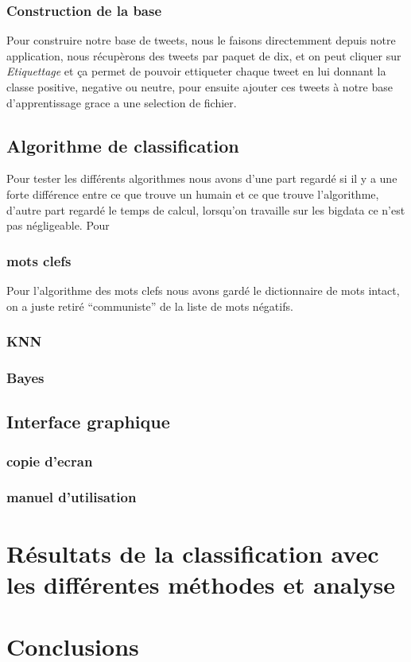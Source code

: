 \documentclass[a4paper,10pt]{report}
\begin{document}
    \subsection{Construction de la base}
      Pour construire notre base de tweets, nous le faisons directemment depuis notre application, nous récupèrons des tweets par 
      paquet de dix, et on peut cliquer sur \emph{Etiquettage} et ça permet de pouvoir ettiqueter chaque tweet en lui donnant la classe positive, negative ou neutre,
      pour ensuite ajouter ces tweets à notre base d'apprentissage grace a une selection de fichier.
  \section{Algorithme de classification}
    Pour tester les différents algorithmes nous avons d'une part regardé si il y a une forte différence entre ce que trouve un humain et ce que trouve l'algorithme, d'autre part
    regardé le temps de calcul, lorsqu'on travaille sur les bigdata ce n'est pas négligeable.
    Pour 
    \subsection{mots clefs}
      Pour l'algorithme des mots clefs nous avons gardé le dictionnaire de mots intact, on a juste retiré ``communiste'' de la liste de mots négatifs.
      
    \subsection{KNN}
    \subsection{Bayes}
  \section{Interface graphique}
    \subsection{copie d'ecran}
    \subsection{manuel d'utilisation}
\chapter{Résultats de la classification avec les différentes méthodes et analyse}
\chapter{Conclusions}
\end{document}
